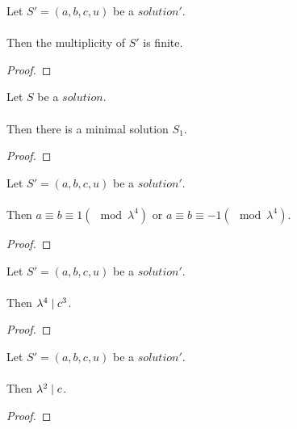 \begin{lemma}
    \label{lmm:Solution1.multiplicity_lambda_c_finite}
    \leanok
    Let $S'=(a, b, c, u)$ be a $solution'$. \\\\
    Then the multiplicity of $S'$ is finite.
\end{lemma}
\begin{proof}
    \leanok
\end{proof}

\begin{lemma}
    \label{lmm:exists_minimal}
    \leanok
    Let $S$ be a $solution$. \\\\
    Then there is a minimal solution $S_1$.
\end{lemma}
\begin{proof}
    \leanok
\end{proof}

\begin{lemma}
    \label{lmm:a_cube_b_cube_same_congr}
    \leanok
    Let $S'=(a, b, c, u)$ be a $solution'$. \\\\
    Then $a \equiv b \equiv 1 (\mod \lambda^4)$ or $a \equiv b \equiv -1 (\mod \lambda^4)$.
\end{lemma}
\begin{proof}
    \leanok
\end{proof}

\begin{lemma}
    \label{lmm:lambda_pow_four_dvd_c_cube}
    \leanok
    Let $S'=(a, b, c, u)$ be a $solution'$. \\\\
    Then $\lambda^4 \mid c^3$.
\end{lemma}
\begin{proof}
    \leanok
\end{proof}

\begin{lemma}
    \label{lmm:lambda_pow_two_dvd_c}
    \leanok
    Let $S'=(a, b, c, u)$ be a $solution'$. \\\\
    Then $\lambda^2 \mid c$.
\end{lemma}
\begin{proof}
    \leanok
\end{proof}

